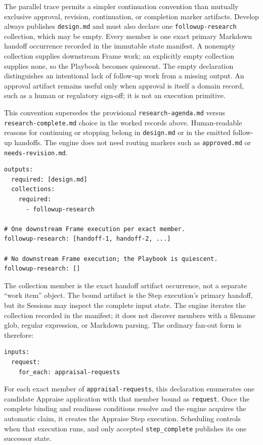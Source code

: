 \documentclass[11pt]{article}
\newcommand{\artifact}[1]{\texttt{#1}}
\begin{document}
The parallel trace permits a simpler continuation convention than mutually
exclusive approval, revision, continuation, or completion marker artifacts.
Develop always publishes \artifact{design.md} and must also declare one
\texttt{followup-research} collection, which may be empty. Every member is one
exact primary Markdown handoff occurrence recorded in the immutable state
manifest. A nonempty collection supplies downstream Frame work; an explicitly
empty collection supplies none, so the Playbook becomes quiescent. The empty
declaration distinguishes an intentional lack of follow-up work from a missing
output. An approval artifact remains useful only when approval is itself a
domain record, such as a human or regulatory sign-off; it is not an execution
primitive.

This convention supersedes the provisional
\artifact{research-agenda.md} versus \artifact{research-complete.md} choice in
the worked records above. Human-readable reasons for continuing or stopping
belong in \artifact{design.md} or in the emitted follow-up handoffs. The engine
does not need routing markers such as \artifact{approved.md} or
\artifact{needs-revision.md}.

\begin{lstlisting}[style=playbook,basicstyle=\ttfamily\scriptsize]
outputs:
  required: [design.md]
  collections:
    required:
      - followup-research

# One downstream Frame execution per exact member.
followup-research: [handoff-1, handoff-2, ...]

# No downstream Frame execution; the Playbook is quiescent.
followup-research: []
\end{lstlisting}

The collection member is the exact handoff artifact occurrence, not a separate
``work item'' object. The bound artifact is the Step execution's primary
handoff, but its Sessions may inspect the complete input state. The engine
iterates the collection recorded in the manifest; it does not discover members
with a filename glob, regular expression, or Markdown parsing. The ordinary
fan-out form is therefore:

\begin{lstlisting}[style=playbook,basicstyle=\ttfamily\scriptsize]
inputs:
  request:
    for_each: appraisal-requests
\end{lstlisting}

For each exact member of \texttt{appraisal-requests}, this declaration
enumerates one candidate Appraise application with that member bound as
\texttt{request}. Once the complete binding and readiness conditions resolve
and the engine acquires the automatic claim, it creates the Appraise Step
execution. Scheduling controls when that execution runs, and only accepted
\texttt{step\_complete} publishes its one successor state.
\end{document}
